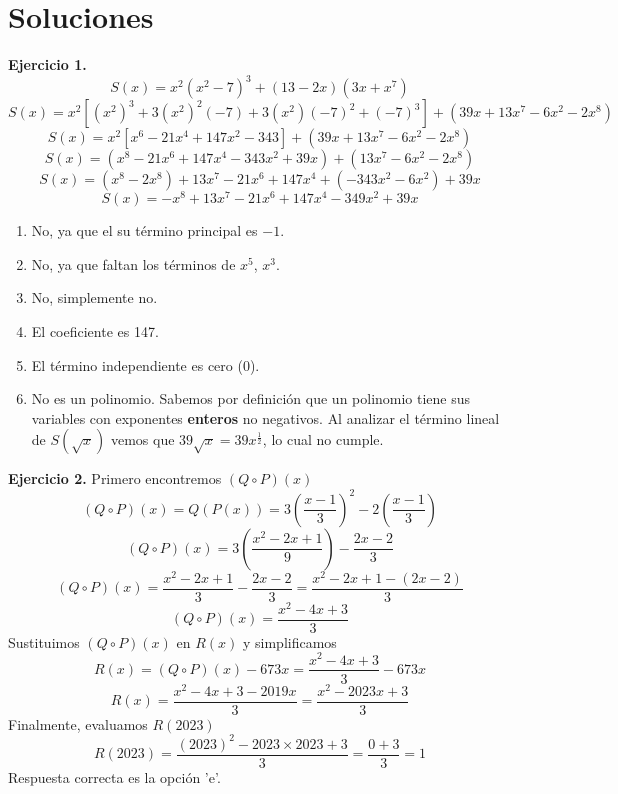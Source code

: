 \newpage

\section*{\large Soluciones}
{
    \textbf{Ejercicio 1.}
    \[S(x) = x^2(x^2 - 7)^3 + (13 - 2x)(3x + x^7)\]
    \[S(x) = x^2 \left[ (x^2)^3 + 3 (x^2)^2(-7) + 3 (x^2)(-7)^2 + (-7)^3 \right] + (39x + 13x^7 - 6x^2 - 2x^8)\]
    \[S(x) = x^2 \left[ x^6 - 21x^4 + 147 x^2 - 343 \right] + (39x + 13x^7 - 6x^2 - 2x^8)\]
    \[S(x) = (x^8 - 21x^6 + 147 x^4 - 343x^2 + 39x) + (13x^7 - 6x^2 - 2x^8)\]
    \[S(x) = (x^8 - 2x^8) + 13x^7 - 21x^6 + 147 x^4 + (- 343x^2 - 6x^2) + 39x\]
    \[S(x) = -x^8 + 13x^7 - 21x^6 + 147 x^4 - 349x^2 + 39x\]

        \begin{enumerate}
            \item No, ya que el su término principal es $-1$.
            \item No, ya que faltan los términos de $x^5$, $x^3$.
            \item No, simplemente no.
            \item El coeficiente es 147.
            \item El término independiente es cero (0).
            \item No es un polinomio. Sabemos por definición que un polinomio tiene sus variables con exponentes \textbf{enteros} no negativos. Al analizar el término lineal de $S(\sqrt {x})$ vemos que $39\sqrt {x} = 39 x^{\frac{1}{2}}$, lo cual no cumple.
        \end{enumerate}

    \textbf{Ejercicio 2.} Primero encontremos $(Q \circ P)(x)$
    \[ (Q \circ P)(x) = Q(P(x)) = 3\left( \frac{x - 1}{3} \right)^2 - 2\left( \frac{x - 1}{3} \right)\]
    \[ (Q \circ P)(x) = 3\left( \frac{x^2 - 2x + 1}{9} \right) - \frac{2x - 2}{3}\]
    \[ (Q \circ P)(x) = \frac{x^2 - 2x + 1}{3} - \frac{2x - 2}{3} = \frac{x^2 - 2x + 1 - (2x - 2)}{3}\]
    \[ (Q \circ P)(x) = \frac{x^2 - 4x + 3}{3}\]
    Sustituimos $(Q \circ P)(x)$ en $R(x)$ y simplificamos
    \[R(x) = (Q \circ P)(x) - 673x = \frac{x^2 - 4x + 3}{3} - 673x\]
    \[R(x) = \frac{x^2 - 4x + 3 - 2019x}{3} = \frac{x^2 - 2023x + 3}{3}\]
    Finalmente, evaluamos $R(2023)$
    \[R(2023) = \frac{(2023)^2 - 2023\times 2023 + 3}{3} = \frac{0 + 3}{3} = 1\]
    Respuesta correcta es la opción 'e'.
}\label{sec:soluciones}
